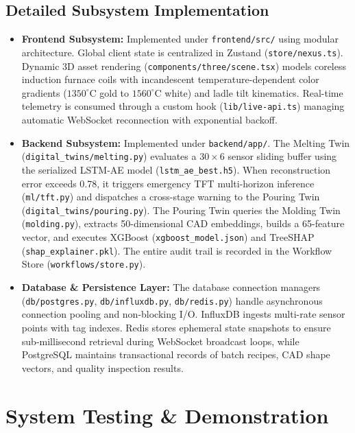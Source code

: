 \documentclass[11pt, a4paper]{article}
\begin{document}
\subsection{Detailed Subsystem Implementation}
\begin{itemize}[noitemsep, topsep=2pt]
    \item \textbf{Frontend Subsystem:} Implemented under \texttt{frontend/src/} using modular architecture. Global client state is centralized in Zustand (\texttt{store/nexus.ts}). Dynamic 3D asset rendering (\texttt{components/three/scene.tsx}) models coreless induction furnace coils with incandescent temperature-dependent color gradients ($1350^\circ\text{C}$ gold to $1560^\circ\text{C}$ white) and ladle tilt kinematics. Real-time telemetry is consumed through a custom hook (\texttt{lib/live-api.ts}) managing automatic WebSocket reconnection with exponential backoff.
    \item \textbf{Backend Subsystem:} Implemented under \texttt{backend/app/}. The Melting Twin (\texttt{digital\_twins/melting.py}) evaluates a $30 \times 6$ sensor sliding buffer using the serialized LSTM-AE model (\texttt{lstm\_ae\_best.h5}). When reconstruction error exceeds 0.78, it triggers emergency TFT multi-horizon inference (\texttt{ml/tft.py}) and dispatches a cross-stage warning to the Pouring Twin (\texttt{digital\_twins/pouring.py}). The Pouring Twin queries the Molding Twin (\texttt{molding.py}), extracts 50-dimensional CAD embeddings, builds a 65-feature vector, and executes XGBoost (\texttt{xgboost\_model.json}) and TreeSHAP (\texttt{shap\_explainer.pkl}). The entire audit trail is recorded in the Workflow Store (\texttt{workflows/store.py}).
    \item \textbf{Database \& Persistence Layer:} The database connection managers (\texttt{db/postgres.py}, \texttt{db/influxdb.py}, \texttt{db/redis.py}) handle asynchronous connection pooling and non-blocking I/O. InfluxDB ingests multi-rate sensor points with tag indexes. Redis stores ephemeral state snapshots to ensure sub-millisecond retrieval during WebSocket broadcast loops, while PostgreSQL maintains transactional records of batch recipes, CAD shape vectors, and quality inspection results.
\end{itemize}

\section{System Testing \& Demonstration}
\end{document}
